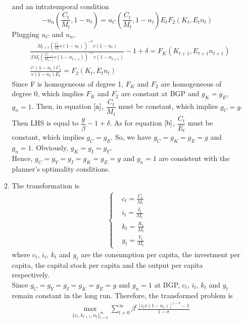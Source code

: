 \documentclass{article}
\begin{document}
\begin{enumerate}
\begin{enumerate}
            and an intratemporal condition 
            \begin{equation*}
                -u_n(\frac{C_t}{M_t},1-n_t)=u_C(\frac{C_t}{M_t},1-n_t)E_tF_2(K_t,E_tn_t)
            \end{equation*}
            Plugging $u_C$ and $u_n$,
            \begin{align}
                &\frac{M_{t+1}\left(\frac{C_t}{M_t}v(1-n_t)\right)^{-\sigma}v(1-n_t)}{\beta M_t\left(\frac{C_{t+1}}{M_{t+1}}v(1-n_{t+1})\right)^{-\sigma}v(1-n_{t+1})}-1+\delta=F_K(K_{t+1},E_{t+1}n_{t+1})\label{a}\\
                &\frac{v'(1-n_t)C_t}{v(1-n_t)E_t}=F_2(K_t,E_tn_t)\label{b}
            \end{align}
            Since F is homogeneous of degree 1, $F_K$ and $F_2$ are homogeneous of degree 0, which implies $F_K$ and $F_2$ are constant at BGP and $g_K=g_E$, $g_n=1$.
            Then, in equation \(\eqref{a}\), $\dfrac{C_t}{M_t}$ must be constant, which implies $g_C=g$. Then LHS is equal to $\dfrac{g}{\beta}-1+\delta$. As for equation \(\eqref{b}\), $\dfrac{C_t}{E_t}$ must be constant, which implies $g_C=g_E$.
            So, we have $g_C=g_K=g_E=g$ and $g_n=1$. Obviously, $g_K=g_I=g_Y$.\\
            Hence, $g_C=g_Y=g_I=g_K=g_E=g$ and $g_n=1$ are consistent with the planner's optimality conditions. 
            \item The transformation is
            \begin{align*}
                \left\{\begin{aligned}
                    &c_t=\frac{C_t}{M_t}\\
                    &i_t=\frac{I_t}{M_t}\\
                    &k_t=\frac{K_t}{M_t}\\
                    &y_t=\frac{Y_t}{M_t}
                \end{aligned}\right.
            \end{align*}
            where $c_t$, $i_t$, $k_t$ and $y_t$ are the consumption per capita, the investment per capita, the capital stock per capita and the output per capita respectively.\\
            Since $g_C=g_Y=g_I=g_K=g_E=g$ and $g_n=1$ at BGP, $c_t$, $i_t$, $k_t$ and $y_t$ remain constant in the long run.
            Therefore, the transformed problem is
            \begin{align*}
                &\max_{\{c_t,k_{t+1},n_t\}_{t=0}^\infty}\sum_{t=0}^\infty\beta^t\frac{\left[c_tv(1-n_t)\right]^{1-\sigma}-1}{1-\sigma}\\

\end{align*}
\end{enumerate}
\end{enumerate}
\end{document}
